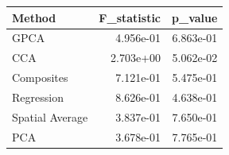 \begin{tabular}{lrr}
\toprule
Method & F_statistic & p_value \\
\midrule
GPCA & 4.956e-01 & 6.863e-01 \\
CCA & 2.703e+00 & 5.062e-02 \\
Composites & 7.121e-01 & 5.475e-01 \\
Regression & 8.626e-01 & 4.638e-01 \\
Spatial Average & 3.837e-01 & 7.650e-01 \\
PCA & 3.678e-01 & 7.765e-01 \\
\bottomrule
\end{tabular}
